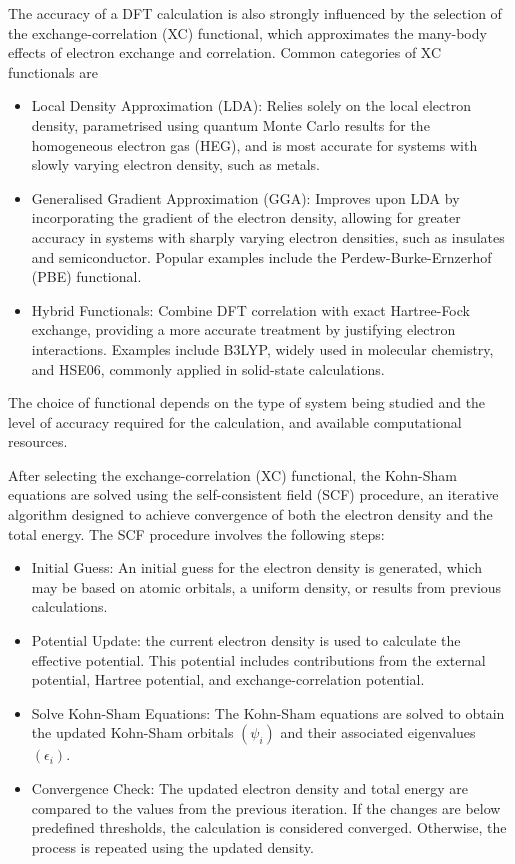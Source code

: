 The accuracy of a DFT calculation is also strongly influenced by the selection of the exchange-correlation (XC) functional, which approximates the many-body effects of electron exchange and correlation.
Common categories of XC functionals are
\begin{itemize}
    \item[1] Local Density Approximation (LDA): Relies solely on the local electron density, parametrised using quantum Monte Carlo results for the homogeneous electron gas (HEG), and is most accurate for systems with slowly varying electron density, such as metals.
    \item[2] Generalised Gradient Approximation (GGA): Improves upon LDA by incorporating the gradient of the electron density, allowing for greater accuracy in systems with sharply varying electron densities, such as insulates and semiconductor. Popular examples include the Perdew-Burke-Ernzerhof (PBE) functional.
    \item[3] Hybrid Functionals: Combine DFT correlation with exact Hartree-Fock exchange, providing a more accurate treatment by justifying electron interactions. Examples include B3LYP, widely used in molecular chemistry, and HSE06, commonly applied in solid-state calculations. 
\end{itemize}
The choice of functional depends on the type of system being studied and the level of accuracy required for the calculation, and available computational resources.

After selecting the exchange-correlation (XC) functional, the Kohn-Sham equations are solved using the self-consistent field (SCF) procedure, an iterative algorithm designed to achieve convergence of both the electron density and the total energy.
The SCF procedure involves the following steps:
\begin{itemize}
    \item[1] Initial Guess: An initial guess for the electron density is generated, which may be based on atomic orbitals, a uniform density, or results from previous calculations.
    \item[2] Potential Update: the current electron density is used to calculate the effective potential. This potential includes contributions from the external potential, Hartree potential, and exchange-correlation potential.
    \item[3] Solve Kohn-Sham Equations: The Kohn-Sham equations are solved to obtain the updated Kohn-Sham orbitals $(\psi_i)$ and their associated eigenvalues $(\epsilon_i)$.
    \item[4] Convergence Check: The updated electron density and total energy are compared to the values from the previous iteration. If the changes are below predefined thresholds, the calculation is considered converged. Otherwise, the process is repeated using the updated density. 
\end{itemize}

